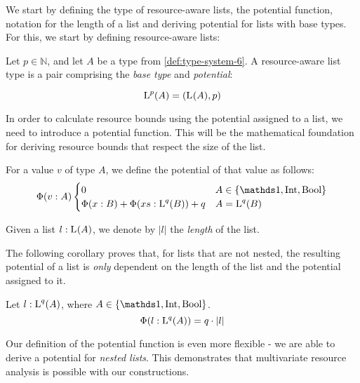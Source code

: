 We start by defining the type of resource-aware lists, the potential function, notation for the length of a list and deriving potential for lists with base types. For this, we start by defining resource-aware lists:

\begin{definition}\label{def:ra-list}
   Let \(p \in \mathbb{N}\), and let \(A\) be a type from \cref{def:type-system-6}. A resource-aware list type is a pair comprising the \emph{base type} and \emph{potential}:

   \[
      \text{L}^{p}(A) = (\text{L}^{}(A), p)
   \]
\end{definition}

In order to calculate resource bounds using the potential assigned to a list, we need to introduce a potential function. This will be the mathematical foundation for deriving resource bounds that respect the size of the list. 

\begin{definition}\label{def:potential-function}
   For a value \(v\) of type \(A\), we define the potential of that value as follows:
   \[
      \Phi(v : A) \begin{cases}
         0                                            & A \in \{\unit, \typeint, \bool\}\\
         \Phi(x : B) + \Phi(xs : \ralist{q}{B}) + q   & A = \ralist{q}{B}
      \end{cases}
   \]
\end{definition}

\begin{definition}\label{def:list-length}
   Given a list \(l : \text{L}^{}(A)\), we denote by \(|l|\) the \emph{length} of the list.
\end{definition}

The following corollary proves that, for lists that are not nested, the resulting potential of a list is \emph{only} dependent on the length of the list and the potential assigned to it.

\begin{corollary}\label{cor:potential-list}
   Let \(l : \text{L}^{q}(A)\), where \(A \in \{\unit, \typeint, \bool\}\). 
   \[
      \Phi(l : \text{L}^{q}(A)) = q \cdot |l|
   \]
\end{corollary}

Our definition of the potential function is even more flexible - we are able to derive a potential for \emph{nested lists}. This demonstrates that multivariate resource analysis is possible with our constructions.

